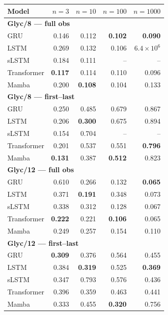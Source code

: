 \begin{tabular*}{\linewidth}{@{\extracolsep{\fill}}lrrrr}
\toprule
Model & $n=3$ & $n=10$ & $n=100$ & $n=1000$ \\
\midrule
\multicolumn{5}{l}{\textbf{Glyc/8 — full obs}} \\
GRU & 0.146 & 0.112 & \textbf{0.102} & \textbf{0.090} \\
LSTM & 0.269 & 0.132 & 0.106 & $6.4\!\times\!10^{6}$ \\
sLSTM & 0.184 & 0.111 & -- & -- \\
Transformer & \textbf{0.117} & 0.114 & 0.110 & 0.096 \\
Mamba & 0.200 & \textbf{0.108} & 0.104 & 0.133 \\
\midrule
\multicolumn{5}{l}{\textbf{Glyc/8 — first--last}} \\
GRU & 0.250 & 0.485 & 0.679 & 0.867 \\
LSTM & 0.206 & \textbf{0.300} & 0.675 & 0.894 \\
sLSTM & 0.154 & 0.704 & -- & -- \\
Transformer & 0.201 & 0.537 & 0.551 & \textbf{0.796} \\
Mamba & \textbf{0.131} & 0.387 & \textbf{0.512} & 0.823 \\
\midrule
\multicolumn{5}{l}{\textbf{Glyc/12 — full obs}} \\
GRU & 0.610 & 0.266 & 0.132 & \textbf{0.065} \\
LSTM & 0.371 & \textbf{0.191} & 0.348 & 0.073 \\
sLSTM & 0.338 & 0.312 & 0.128 & 0.067 \\
Transformer & \textbf{0.222} & 0.221 & \textbf{0.106} & 0.065 \\
Mamba & 0.249 & 0.257 & 0.154 & 0.110 \\
\midrule
\multicolumn{5}{l}{\textbf{Glyc/12 — first--last}} \\
GRU & \textbf{0.309} & 0.376 & 0.564 & 0.455 \\
LSTM & 0.384 & \textbf{0.319} & 0.525 & \textbf{0.369} \\
sLSTM & 0.347 & 0.793 & 0.576 & 0.436 \\
Transformer & 0.396 & 0.359 & 0.463 & 0.441 \\
Mamba & 0.333 & 0.455 & \textbf{0.320} & 0.756 \\
\bottomrule
\end{tabular*}
